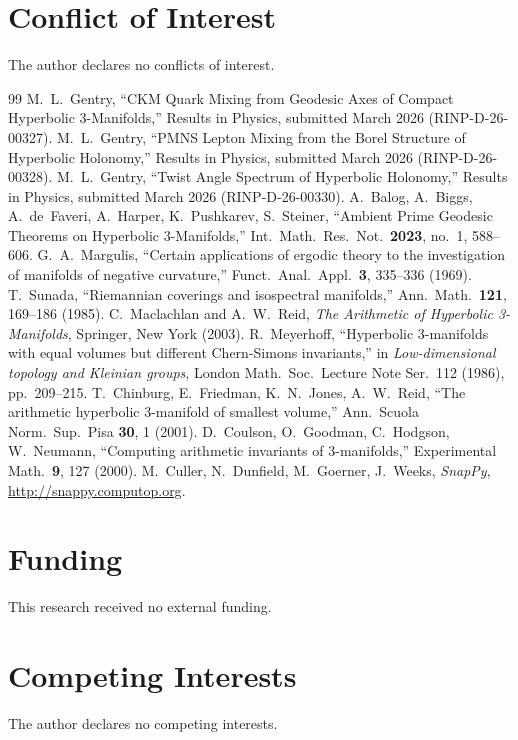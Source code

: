 \documentclass[12pt,a4paper]{article}
\begin{document}
\section*{Conflict of Interest}
The author declares no conflicts of interest.

\begin{thebibliography}{99}
  M.~L.~Gentry,
  ``CKM Quark Mixing from Geodesic Axes of Compact Hyperbolic 3-Manifolds,''
  Results in Physics, submitted March 2026 (RINP-D-26-00327).
  M.~L.~Gentry,
  ``PMNS Lepton Mixing from the Borel Structure of Hyperbolic Holonomy,''
  Results in Physics, submitted March 2026 (RINP-D-26-00328).
  M.~L.~Gentry,
  ``Twist Angle Spectrum of Hyperbolic Holonomy,''
  Results in Physics, submitted March 2026 (RINP-D-26-00330).
  A.~Balog, A.~Biggs, A.~de~Faveri, A.~Harper, K.~Pushkarev, S.~Steiner,
  ``Ambient Prime Geodesic Theorems on Hyperbolic 3-Manifolds,''
  Int.\ Math.\ Res.\ Not.\ \textbf{2023}, no.~1, 588--606.
  G.~A.~Margulis,
  ``Certain applications of ergodic theory to the investigation of manifolds
  of negative curvature,'' Funct.\ Anal.\ Appl.\ \textbf{3}, 335--336 (1969).
  T.~Sunada,
  ``Riemannian coverings and isospectral manifolds,''
  Ann.\ Math.\ \textbf{121}, 169--186 (1985).
  C.~Maclachlan and A.~W.~Reid,
  \textit{The Arithmetic of Hyperbolic 3-Manifolds},
  Springer, New York (2003).
  R.~Meyerhoff,
  ``Hyperbolic 3-manifolds with equal volumes but different Chern-Simons
  invariants,''
  in \textit{Low-dimensional topology and Kleinian groups},
  London Math.\ Soc.\ Lecture Note Ser.~112 (1986), pp.~209--215.
  T.~Chinburg, E.~Friedman, K.~N.~Jones, A.~W.~Reid,
  ``The arithmetic hyperbolic 3-manifold of smallest volume,''
  Ann.\ Scuola Norm.\ Sup.\ Pisa \textbf{30}, 1 (2001).
  D.~Coulson, O.~Goodman, C.~Hodgson, W.~Neumann,
  ``Computing arithmetic invariants of 3-manifolds,''
  Experimental Math.\ \textbf{9}, 127 (2000).
  M.~Culler, N.~Dunfield, M.~Goerner, J.~Weeks,
  \textit{SnapPy}, \url{http://snappy.computop.org}.
\end{thebibliography}

\section*{Funding}
This research received no external funding.

\section*{Competing Interests}
The author declares no competing interests.
\end{document}
